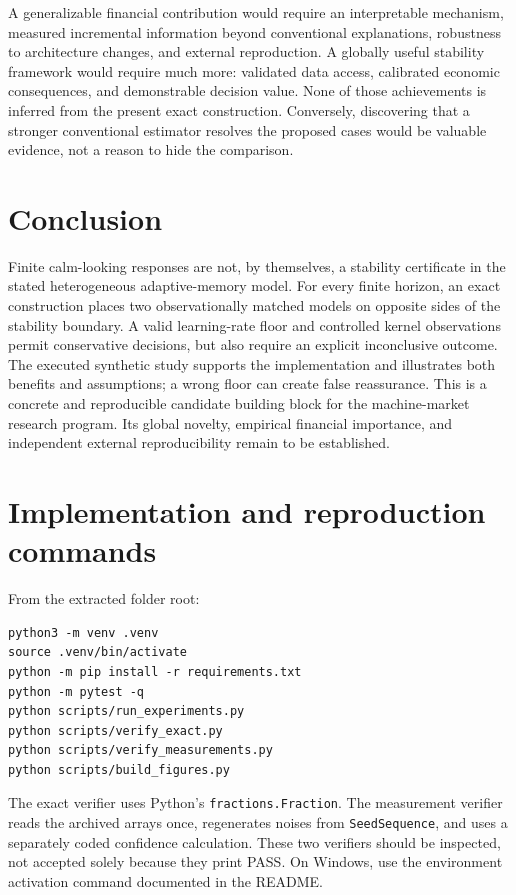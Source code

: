 \documentclass[11pt]{article}
\theoremstyle{remark}\newtheorem{remark}[theorem]{Remark}
\begin{document}
A generalizable financial contribution would require an interpretable mechanism, measured incremental information beyond conventional explanations, robustness to architecture changes, and external reproduction. A globally useful stability framework would require much more: validated data access, calibrated economic consequences, and demonstrable decision value. None of those achievements is inferred from the present exact construction. Conversely, discovering that a stronger conventional estimator resolves the proposed cases would be valuable evidence, not a reason to hide the comparison.

\section{Conclusion}
Finite calm-looking responses are not, by themselves, a stability certificate in the stated heterogeneous adaptive-memory model. For every finite horizon, an exact construction places two observationally matched models on opposite sides of the stability boundary. A valid learning-rate floor and controlled kernel observations permit conservative decisions, but also require an explicit inconclusive outcome. The executed synthetic study supports the implementation and illustrates both benefits and assumptions; a wrong floor can create false reassurance. This is a concrete and reproducible candidate building block for the machine-market research program. Its global novelty, empirical financial importance, and independent external reproducibility remain to be established.

\appendix
\section{Implementation and reproduction commands}
From the extracted folder root:
\begin{lstlisting}
python3 -m venv .venv
source .venv/bin/activate
python -m pip install -r requirements.txt
python -m pytest -q
python scripts/run_experiments.py
python scripts/verify_exact.py
python scripts/verify_measurements.py
python scripts/build_figures.py
\end{lstlisting}
The exact verifier uses Python's \texttt{fractions.Fraction}. The measurement verifier reads the archived arrays once, regenerates noises from \texttt{SeedSequence}, and uses a separately coded confidence calculation. These two verifiers should be inspected, not accepted solely because they print PASS. On Windows, use the environment activation command documented in the README.
\end{document}
